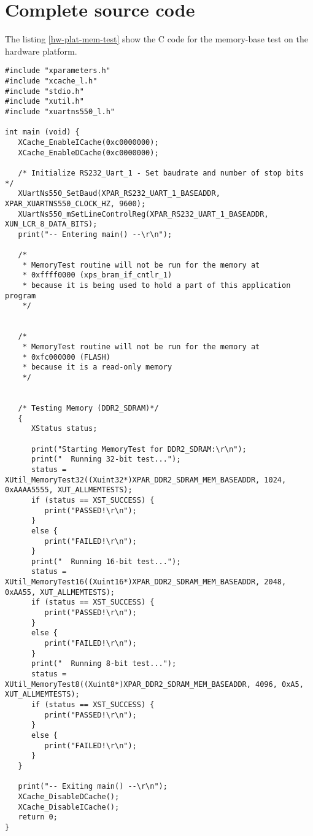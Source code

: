 \chapter{Complete source code}
The listing \ref{hw-plat-mem-test} show the C code for the memory-base test on the hardware platform.\\[0.5cm]

\lstset{%
	numbers=left, %
	numberstyle=\tiny, %
	stepnumber=1, %
	numbersep=10pt, %
	language=C,%
	breaklines=true,                %
	breakatwhitespace=true,
	basicstyle=\footnotesize
}
\begin{lstlisting}[title={Memory-base test in C code},label=hw-plat-mem-test, caption={[Prueba de la plataforma hardware base]Prueba de la plataforma hardware base donde se ejercita el módulo DDR y el microprocesador principalmente.}]
#include "xparameters.h"
#include "xcache_l.h"
#include "stdio.h"
#include "xutil.h"
#include "xuartns550_l.h"

int main (void) {
   XCache_EnableICache(0xc0000000);
   XCache_EnableDCache(0xc0000000);

   /* Initialize RS232_Uart_1 - Set baudrate and number of stop bits */
   XUartNs550_SetBaud(XPAR_RS232_UART_1_BASEADDR, XPAR_XUARTNS550_CLOCK_HZ, 9600);
   XUartNs550_mSetLineControlReg(XPAR_RS232_UART_1_BASEADDR, XUN_LCR_8_DATA_BITS);
   print("-- Entering main() --\r\n");

   /* 
    * MemoryTest routine will not be run for the memory at 
    * 0xffff0000 (xps_bram_if_cntlr_1)
    * because it is being used to hold a part of this application program
    */


   /* 
    * MemoryTest routine will not be run for the memory at 
    * 0xfc000000 (FLASH)
    * because it is a read-only memory
    */


   /* Testing Memory (DDR2_SDRAM)*/
   {
      XStatus status;

      print("Starting MemoryTest for DDR2_SDRAM:\r\n");
      print("  Running 32-bit test...");
      status = XUtil_MemoryTest32((Xuint32*)XPAR_DDR2_SDRAM_MEM_BASEADDR, 1024, 0xAAAA5555, XUT_ALLMEMTESTS);
      if (status == XST_SUCCESS) {
         print("PASSED!\r\n");
      }
      else {
         print("FAILED!\r\n");
      }
      print("  Running 16-bit test...");
      status = XUtil_MemoryTest16((Xuint16*)XPAR_DDR2_SDRAM_MEM_BASEADDR, 2048, 0xAA55, XUT_ALLMEMTESTS);
      if (status == XST_SUCCESS) {
         print("PASSED!\r\n");
      }
      else {
         print("FAILED!\r\n");
      }
      print("  Running 8-bit test...");
      status = XUtil_MemoryTest8((Xuint8*)XPAR_DDR2_SDRAM_MEM_BASEADDR, 4096, 0xA5, XUT_ALLMEMTESTS);
      if (status == XST_SUCCESS) {
         print("PASSED!\r\n");
      }
      else {
         print("FAILED!\r\n");
      }
   }

   print("-- Exiting main() --\r\n");
   XCache_DisableDCache();
   XCache_DisableICache();
   return 0;
}
\end{lstlisting}


